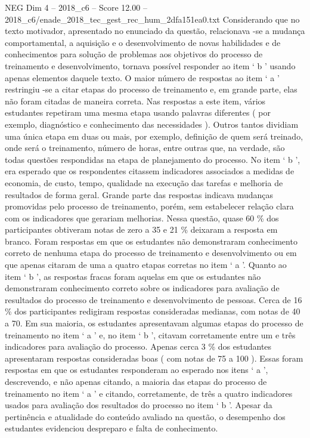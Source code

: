 \begin{textsample}{NEG Dim 4 – 2018\_c6 – Score 12.00 – 2018\_c6/enade\_2018\_tec\_gest\_rec\_hum\_2dfa151ea0.txt}
Considerando que no texto motivador, apresentado no enunciado da questão, relacionava -se a mudança comportamental, a aquisição e o desenvolvimento de novas habilidades e de conhecimentos para solução de problemas aos objetivos do processo de treinamento e desenvolvimento, tornava possível responder ao item ‘ b ’ usando apenas elementos daquele texto.
O maior número de respostas ao item ‘ a ’ restringiu -se a citar etapas do processo de treinamento e, em grande parte, elas não foram citadas de maneira correta.
Nas respostas a este item, vários estudantes repetiram uma mesma etapa usando palavras diferentes ( por exemplo, diagnóstico e conhecimento das necessidades ).
Outros tantos dividiam uma única etapa em duas ou mais, por exemplo, definição de quem será treinado, onde será o treinamento, número de horas, entre outras que, na verdade, são todas questões respondidas na etapa de planejamento do processo.
No item ‘ b ’, era esperado que os respondentes citassem indicadores associados a medidas de economia, de custo, tempo, qualidade na execução das tarefas e melhoria de resultados de forma geral.
Grande parte das respostas indicava mudanças promovidas pelo processo de treinamento, porém, sem estabelecer relação clara com os indicadores que gerariam melhorias.
Nessa questão, quase 60 \% dos participantes obtiveram notas de zero a 35 e 21 \% deixaram a resposta em branco.
Foram respostas em que os estudantes não demonstraram conhecimento correto de nenhuma etapa do processo de treinamento e desenvolvimento ou em que apenas citaram de uma a quatro etapas corretas no item ‘ a ’.
Quanto ao item ‘ b ’, as respostas fracas foram aquelas em que os estudantes não demonstraram conhecimento correto sobre os indicadores para avaliação de resultados do processo de treinamento e desenvolvimento de pessoas.
Cerca de 16 \% dos participantes redigiram respostas consideradas medianas, com notas de 40 a 70.
Em sua maioria, os estudantes apresentavam algumas etapas do processo de treinamento no item ‘ a ’ e, no item ‘ b ’, citavam corretamente entre um e três indicadores para avaliação do processo.
Apenas cerca 3 \% dos estudantes apresentaram respostas consideradas boas ( com notas de 75 a 100 ).
Essas foram respostas em que os estudantes responderam ao esperado nos itens ‘ a ’, descrevendo, e não apenas citando, a maioria das etapas do processo de treinamento no item ‘ a ’ e citando, corretamente, de três a quatro indicadores usados para avaliação dos resultados do processo no item ‘ b ’.
Apesar da pertinência e atualidade do conteúdo avaliado na questão, o desempenho dos estudantes evidenciou despreparo e falta de conhecimento.

\end{textsample}
